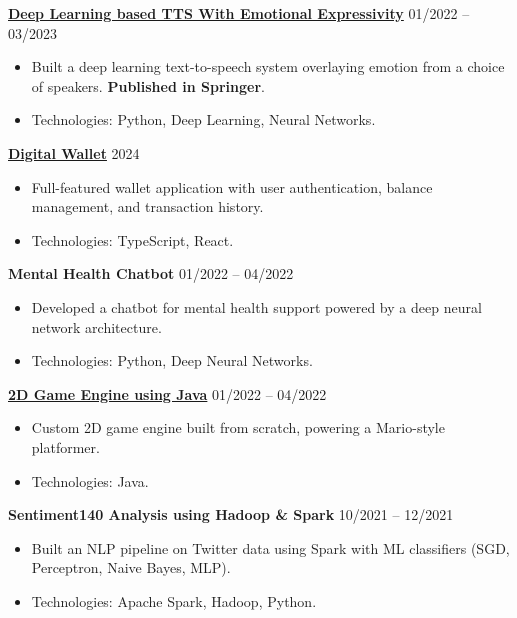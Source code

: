 \documentclass[a4paper,11pt]{article}
\begin{document}
\noindent\textbf{\href{https://link.springer.com/chapter/10.1007/978-3-031-37940-6_25}{Deep Learning based TTS With Emotional Expressivity}} \hfill 01/2022 -- 03/2023
\begin{itemize}[noitemsep,topsep=0pt,parsep=0pt,partopsep=0pt]
    \item Built a deep learning text-to-speech system overlaying emotion from a choice of speakers. \textbf{Published in Springer}.
    \item Technologies: Python, Deep Learning, Neural Networks.
\end{itemize}

\noindent\textbf{\href{https://github.com/Abhijit-Sethi/Digital-Wallet}{Digital Wallet}} \hfill 2024
\begin{itemize}[noitemsep,topsep=0pt,parsep=0pt,partopsep=0pt]
    \item Full-featured wallet application with user authentication, balance management, and transaction history.
    \item Technologies: TypeScript, React.
\end{itemize}

\noindent\textbf{Mental Health Chatbot} \hfill 01/2022 -- 04/2022
\begin{itemize}[noitemsep,topsep=0pt,parsep=0pt,partopsep=0pt]
    \item Developed a chatbot for mental health support powered by a deep neural network architecture.
    \item Technologies: Python, Deep Neural Networks.
\end{itemize}

\noindent\textbf{\href{https://github.com/Abhijit-Sethi/mario2D}{2D Game Engine using Java}} \hfill 01/2022 -- 04/2022
\begin{itemize}[noitemsep,topsep=0pt,parsep=0pt,partopsep=0pt]
    \item Custom 2D game engine built from scratch, powering a Mario-style platformer.
    \item Technologies: Java.
\end{itemize}

\noindent\textbf{Sentiment140 Analysis using Hadoop \& Spark} \hfill 10/2021 -- 12/2021
\begin{itemize}[noitemsep,topsep=0pt,parsep=0pt,partopsep=0pt]
    \item Built an NLP pipeline on Twitter data using Spark with ML classifiers (SGD, Perceptron, Naive Bayes, MLP).
    \item Technologies: Apache Spark, Hadoop, Python.
\end{itemize}
\end{document}
